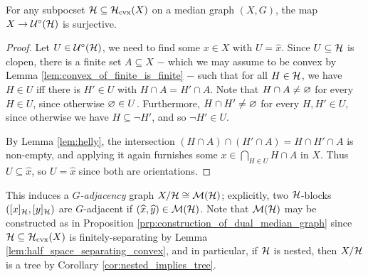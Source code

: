 \documentclass[reqno]{amsart}
\begin{document}
    \begin{lemma}\label{lem:H_blocks_form_a_median_graph}
        For any subpocset $\mc{H}\subseteq\mc{H}_\mathrm{cvx}(X)$ on a median graph $(X,G)$, the map $X\to\mc{U}^\circ(\mc{H})$ is surjective.
    \end{lemma}
    \begin{proof}
        Let $U\in\mc{U}^\circ(\mc{H})$, we need to find some $x\in X$ with $U=\widehat{x}$. Since $U\subseteq\mc{H}$ is clopen, there is a finite set $A\subseteq X$ $-$ which we may assume to be convex by Lemma \ref{lem:convex_of_finite_is_finite} $-$ such that for all $H\in\mc{H}$, we have $H\in U$ iff there is $H'\in U$ with $H\cap A=H'\cap A$. Note that $H\cap A\neq\em$ for every $H\in U$, since otherwise $\em\in U$. Furthermore, $H\cap H'\neq\em$ for every $H,H'\in U$, since otherwise we have $H\subseteq\lnot H'$, and so $\lnot H'\in U$.

        By Lemma \ref{lem:helly}, the intersection $(H\cap A)\cap(H'\cap A)=H\cap H'\cap A$ is non-empty, and applying it again furnishes some $x\in\bigcap_{H\in U}H\cap A$ in $X$. Thus $U\subseteq\widehat{x}$, so $U=\widehat{x}$ since both are orientations.
    \end{proof}

    This induces a \textit{$G$-adjacency} graph $X/\mc{H}\iso\mc{M}(\mc{H})$; explicitly, two $\mc{H}$-blocks $([x]_\mc{H},[y]_\mc{H})$ are $G$-adjacent if $(\widehat{x},\widehat{y})\in\mc{M}(\mc{H})$. Note that $\mc{M}(\mc{H})$ may be constructed as in Proposition \ref{prp:construction_of_dual_median_graph} since $\mc{H}\subseteq\mc{H}_\mathrm{cvx}(X)$ is finitely-separating by Lemma \ref{lem:half_space_separating_convex}, and in particular, if $\mc{H}$ is nested, then $X/\mc{H}$ is a tree by Corollary \ref{cor:nested_implies_tree}.
\end{document}
